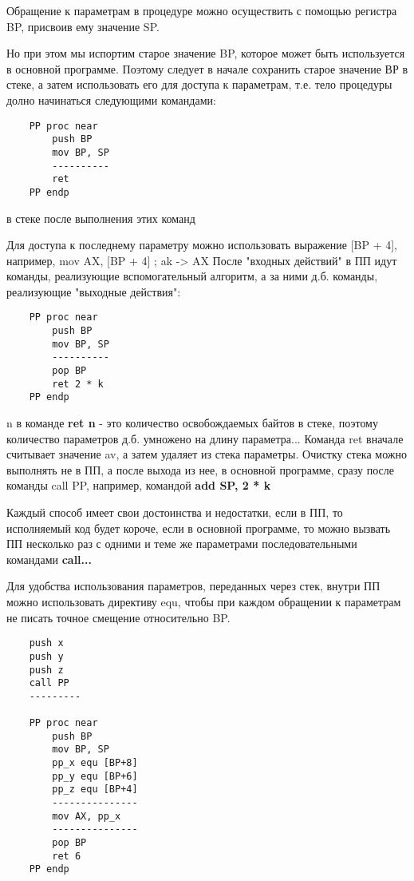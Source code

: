 Обращение к параметрам в процедуре можно осуществить с помощью регистра BP, присвоив ему значение SP.

Но при этом мы испортим старое значение BP, которое может быть используется в основной программе. Поэтому следует в начале сохранить старое значение ВР в стеке, а затем использовать его
для доступа к параметрам, т.е. тело процедуры долно начинаться следующими командами:
\begin{verbatim}
    PP proc near
        push BP
        mov BP, SP
        ----------
        ret
    PP endp
\end{verbatim}

в стеке после выполнения этих команд
\begin{figure}
\end{figure}

Для доступа к последнему параметру можно использовать выражение [BP + 4], например, mov AX, [BP + 4] ; ak -> AX
После "входных действий" в ПП идут команды, реализующие вспомогательный алгоритм, а за ними д.б. команды, реализующие "выходные действия":

\begin{verbatim}
    PP proc near
        push BP
        mov BP, SP
        ----------
        pop BP
        ret 2 * k
    PP endp
\end{verbatim}

n в команде \textbf{ret n} - это количество освобождаемых байтов в стеке, поэтому количество параметров д.б. умножено на длину параметра...
Команда ret вначале считывает значение av, а затем удаляет из стека параметры. Очистку стека можно выполнять не в ПП, а после выхода из нее, в основной программе, сразу после команды call PP, например, командой \textbf{add SP, 2 * k}

Каждый способ имеет свои достоинства и недостатки, если в ПП, то исполняемый код будет короче, если в основной программе, то можно вызвать ПП несколько раз с одними и теме же параметрами последовательными командами \textbf{call...}

Для удобства использования параметров, переданных через стек, внутри ПП можно использовать директиву equ, чтобы при каждом обращении к параметрам не писать точное смещение относительно BP.

\begin{verbatim}
    push x
    push y
    push z
    call PP
    ---------

    PP proc near
        push BP
        mov BP, SP
        pp_x equ [BP+8]
        pp_y equ [BP+6]
        pp_z equ [BP+4]
        ---------------
        mov AX, pp_x
        ---------------
        pop BP
        ret 6
    PP endp
\end{verbatim}

